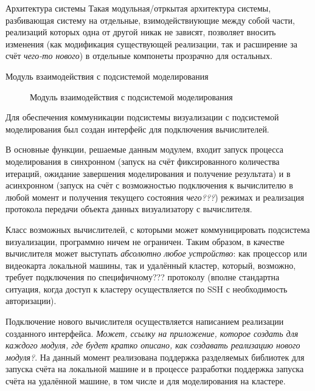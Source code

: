 \documentclass[a4paper,12pt]{extarticle}
\begin{document}
\begin{section}{Архитектура системы}
Такая модульная/отркытая архитектура системы, разбивающая систему на отдельные, взимодействиующие между собой части, реализаций которых одна от другой никак не зависят, позволяет вносить изменения (как модификация существующей реализации, так и расширение за счёт \textit{чего-то нового}) в отдельные компонеты прозрачно для остальных.

\begin{subsection}{Модуль взаимодействия с подсистемой моделирования}
    \begin{figure}[h]
        \caption{Модуль взаимодействия с подсистемой моделирования}
        \label{ris:architecture-calc}
    \end{figure}
    
    Для обеспечения коммуникации подсистемы визуализации с подсистемой моделирования был создан интерфейс для подключения вычислителей.

    В основные функции, решаемые данным модулем, входит запуск процесса моделирования в синхронном (запуск на счёт фиксированного количества итераций, ожидание завершения моделирования и получение результата) и в асинхронном (запуск на счёт с возможностью подключения к вычислителю в любой момент и получения текущего состояния \textit{чего???}) режимах и реализация протокола передачи объекта данных визуализатору с вычислителя.

    Класс возможных вычислителей, с которыми может коммуницировать подсистема визуализации, программно ничем не ограничен. Таким образом, в качестве вычислителя может выступать \textit{абсолютно любое устройство}: как процессор или видеокарта локальной машины, так и удалённый кластер, который, возможно, требует подключения по специфичному??? протоколу (вполне стандартна ситуация, когда доступ к кластеру осуществляется по SSH с необходимость авторизации).

    Подключение нового вычислителя осуществляется написанием реализации созданного интерфейса.
    \textit{Может, ссылку на приложение, которое создать для каждого модуля, где будет кратко описано, как создавать реализацию нового модуля?}. На данный момент реализована поддержка разделяемых библиотек для запуска счёта на локальной машине и в процессе разработки поддержка запуска счёта на удалённой машине, в том числе и для моделирования на кластере.


\end{subsection}
\end{section}
\end{document}
